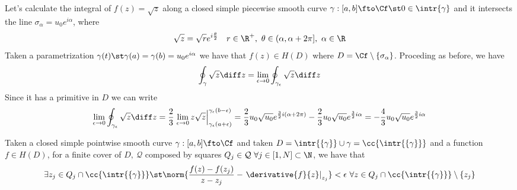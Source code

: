 \documentclass[../mmf.tex]{subfiles}
\begin{document}
\begin{eg}
	Let's calculate the integral of $f(z)=\sqrt{z}$ along a closed simple piecewise smooth curve $\gamma:[a,b]\fto\Cf\st0\in\intr{\gamma}$ and it intersects the line $\sigma_\alpha=u_0e^{i\alpha}$, where
	\begin{equation*}
		\sqrt{z}=\sqrt{r}e^{i\frac{\theta}{2}}\quad r\in\R^+,\ \theta\in(\alpha,\alpha+2\pi],\ \alpha\in\R
	\end{equation*}
	Taken a parametrization $\gamma(t)\st\gamma(a)=\gamma(b)=u_0e^{i\alpha}$ we have that $f(z)\in H(D)$ where $D=\Cf\setminus\{\sigma_\alpha\}$. Proceding as before, we have
	\begin{equation*}
		\oint_{\gamma}^{}\sqrt{z}\diff z=\lim_{\epsilon\to0}\oint_{\gamma_\epsilon}^{}\sqrt{z}\diff z
	\end{equation*}
	Since it has a primitive in $D$ we can write
	\begin{equation*}
		\lim_{\epsilon\to0}\oint_{\gamma_\epsilon}\sqrt{z}\diff z=\frac{2}{3}\left.\lim_{\epsilon\to0}z\sqrt{z}\right|^{\gamma_\epsilon(b-\epsilon)}_{\gamma_\epsilon(a+\epsilon)}=\frac{2}{3}u_0\sqrt{u_0}e^{\frac{3}{2}i(\alpha+2\pi)}-\frac{2}{3}u_0\sqrt{u_0}e^{\frac{3}{2}i\alpha}=-\frac{4}{3}u_0\sqrt{u_0}e^{\frac{3}{2}i\alpha}
	\end{equation*}
\end{eg}
\begin{lem}
	Taken a closed simple pointwise smooth curve $\gamma:[a,b]\fto\Cf$ and taken $D=\intr{\{\gamma\}}\cup\gamma=\cc{\intr{\{\gamma\}}}$ and a function $f\in H(D)$, for a finite cover of $D,\ \mathcal{Q}$ composed by squares $Q_j\in\mathcal{Q}\ \forall j\in[1,N]\subset\N$, we have that
	\begin{equation*}
		\exists z_j\in Q_j\cap\cc{\intr{\{\gamma\}}}\st\norm{\frac{f(z)-f(z_j)}{z-z_j}-\left.\derivative{f}{z}\right|_{z_j}}<\epsilon\ \forall z\in Q_j\cap\cc{\intr{\{\gamma\}}}\setminus\{z_j\}
	\end{equation*}
\end{lem}
\end{document}
